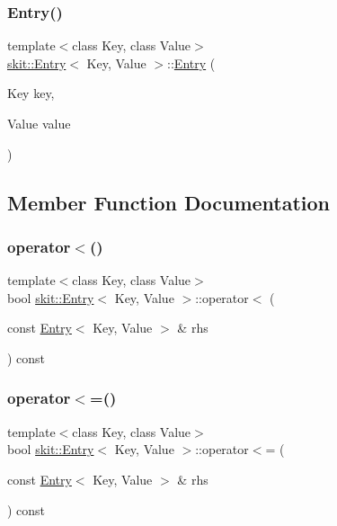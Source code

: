 \subsubsection{\texorpdfstring{Entry()}{Entry()}\hspace{0.1cm}{\footnotesize\ttfamily [2/2]}}
{\footnotesize\ttfamily template$<$class Key, class Value$>$ \\
\hyperlink{structskit_1_1Entry}{skit\+::\+Entry}$<$ Key, Value $>$\+::\hyperlink{structskit_1_1Entry}{Entry} (\begin{DoxyParamCaption}\item[{Key}]{key,  }\item[{Value}]{value }\end{DoxyParamCaption})\hspace{0.3cm}{\ttfamily [inline]}}



\subsection{Member Function Documentation}
\mbox{\label{structskit_1_1Entry_a2f4f5018aeb4b52e420339775a6402d1}} 
\subsubsection{\texorpdfstring{operator$<$()}{operator<()}}
{\footnotesize\ttfamily template$<$class Key, class Value$>$ \\
bool \hyperlink{structskit_1_1Entry}{skit\+::\+Entry}$<$ Key, Value $>$\+::operator$<$ (\begin{DoxyParamCaption}\item[{const \hyperlink{structskit_1_1Entry}{Entry}$<$ Key, Value $>$ \&}]{rhs }\end{DoxyParamCaption}) const\hspace{0.3cm}{\ttfamily [inline]}}

\mbox{\label{structskit_1_1Entry_a9d351890a0b1fe3e08d6b8738ec70982}} 
\subsubsection{\texorpdfstring{operator$<$=()}{operator<=()}}
{\footnotesize\ttfamily template$<$class Key, class Value$>$ \\
bool \hyperlink{structskit_1_1Entry}{skit\+::\+Entry}$<$ Key, Value $>$\+::operator$<$= (\begin{DoxyParamCaption}\item[{const \hyperlink{structskit_1_1Entry}{Entry}$<$ Key, Value $>$ \&}]{rhs }\end{DoxyParamCaption}) const\hspace{0.3cm}{\ttfamily [inline]}}

